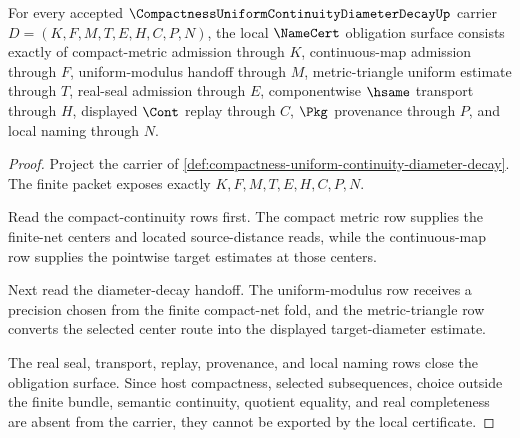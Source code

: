 \begin{theorem}
\label{thm:compactness-uniform-continuity-diameter-decay-namecert-obligations}
For every accepted $\CompactnessUniformContinuityDiameterDecayUp$ carrier $D=(K,F,M,T,E,H,C,P,N)$, the local $\NameCert$ obligation surface consists exactly of compact-metric admission through $K$, continuous-map admission through $F$, uniform-modulus handoff through $M$, metric-triangle uniform estimate through $T$, real-seal admission through $E$, componentwise $\hsame$ transport through $H$, displayed $\Cont$ replay through $C$, $\Pkg$ provenance through $P$, and local naming through $N$.
\end{theorem}
\begin{proof}
Project the carrier of \autoref{def:compactness-uniform-continuity-diameter-decay}. The finite packet exposes exactly $K,F,M,T,E,H,C,P,N$.

Read the compact-continuity rows first. The compact metric row supplies the finite-net centers and located source-distance reads, while the continuous-map row supplies the pointwise target estimates at those centers.

Next read the diameter-decay handoff. The uniform-modulus row receives a precision chosen from the finite compact-net fold, and the metric-triangle row converts the selected center route into the displayed target-diameter estimate.

The real seal, transport, replay, provenance, and local naming rows close the obligation surface. Since host compactness, selected subsequences, choice outside the finite bundle, semantic continuity, quotient equality, and real completeness are absent from the carrier, they cannot be exported by the local certificate.
\end{proof}

